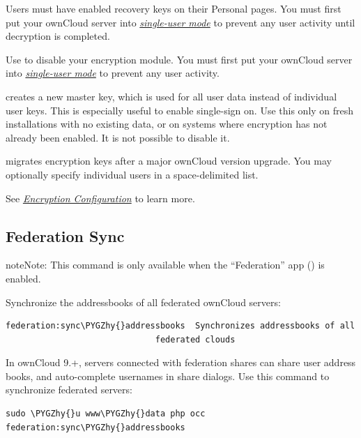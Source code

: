 \documentclass[letterpaper,10pt,english]{sphinxmanual}
\def\PYGZhy{\char`\-}
\begin{document}
Users must have enabled recovery keys on their Personal pages. You must first
put your ownCloud server into {\hyperref[configuration_server/occ_command:maintenance\string-commands\string-label]{\emph{single-user
mode}}} to prevent any user activity until
decryption is completed.

Use  to disable your encryption module. You must first put
your ownCloud server into {\hyperref[configuration_server/occ_command:maintenance\string-commands\string-label]{\emph{single-user mode}}}
to prevent any user activity.

 creates a new master key, which is used for all
user data instead of individual user keys. This is especially useful to enable
single-sign on. Use this only on fresh installations with no existing data, or
on systems where encryption has not already been enabled. It is not possible to
disable it.

 migrates encryption keys after a major ownCloud version
upgrade. You may optionally specify individual users in a space-delimited list.

See {\hyperref[configuration_files/encryption_configuration::doc]{\emph{\emph{Encryption Configuration}}}} to learn more.


\subsection{Federation Sync}
\label{configuration_server/occ_command:federation-sync-label}\label{configuration_server/occ_command:federation-sync}
\begin{notice}{note}{Note:}
This command is only available when the ``Federation'' app () is
enabled.
\end{notice}

Synchronize the addressbooks of all federated ownCloud servers:

\begin{Verbatim}[commandchars=\\\{\}]
federation:sync\PYGZhy{}addressbooks  Synchronizes addressbooks of all
                              federated clouds
\end{Verbatim}

In ownCloud 9.+, servers connected with federation shares can share user
address books, and auto-complete usernames in share dialogs. Use this command
to synchronize federated servers:

\begin{Verbatim}[commandchars=\\\{\}]
sudo \PYGZhy{}u www\PYGZhy{}data php occ federation:sync\PYGZhy{}addressbooks
\end{Verbatim}
\end{document}
